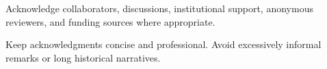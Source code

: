 \documentclass[
    letterpaper,
    runningheads,
    USenglish
  ]{llncs}
\begin{document}

\ifEprint
	\vfill
	\clearpage


	Acknowledge collaborators, discussions, institutional support,
	anonymous reviewers, and funding sources where appropriate.

	Keep acknowledgments concise and professional. Avoid excessively
	informal remarks or long historical narratives.

	\vfill
	\clearpage
\fi



\ifSubmission
	

\else

	\begin{small}
		\vfill
		\clearpage
		
		\fi
		
		\ifSubmission\else
		\vfill
		\clearpage
	\end{small}

\fi


\appendix

\end{document}
